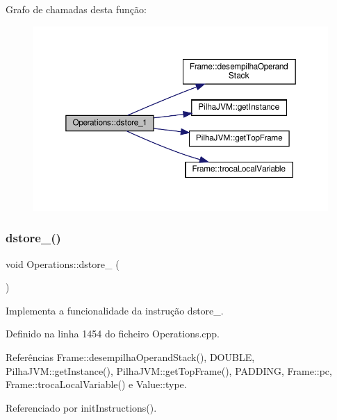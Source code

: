 Grafo de chamadas desta função\+:
\nopagebreak
\begin{figure}[H]
\begin{center}
\leavevmode
\includegraphics[width=350pt]{classOperations_a5f12c99fca34f123522a6c1461782e5f_cgraph}
\end{center}
\end{figure}
\mbox{\label{classOperations_ad0f97963e6eb2482f5032fdb3465ec94}} 
\subsubsection{\texorpdfstring{dstore\+\_()}{dstore\_2()}}
{\footnotesize\ttfamily void Operations\+::dstore\+\_ (\begin{DoxyParamCaption}{ }\end{DoxyParamCaption})\hspace{0.3cm}{\ttfamily [private]}}



Implementa a funcionalidade da instrução dstore\+\_. 



Definido na linha 1454 do ficheiro Operations.\+cpp.



Referências Frame\+::desempilha\+Operand\+Stack(), D\+O\+U\+B\+LE, Pilha\+J\+V\+M\+::get\+Instance(), Pilha\+J\+V\+M\+::get\+Top\+Frame(), P\+A\+D\+D\+I\+NG, Frame\+::pc, Frame\+::troca\+Local\+Variable() e Value\+::type.



Referenciado por init\+Instructions().

